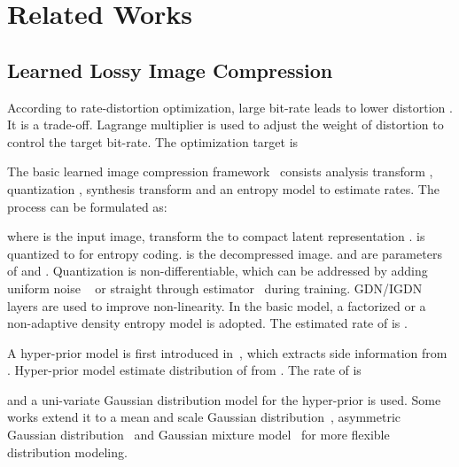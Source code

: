 \documentclass[sigconf]{acmart}
\begin{document}
\section{Related Works}\label{Sec:related}
\subsection{Learned Lossy Image Compression}
According to rate-distortion optimization, large bit-rate 
leads to lower distortion .
It is a trade-off. Lagrange multiplier  is used to adjust the weight of
distortion to control the target bit-rate. The optimization target is
\par
The basic learned image compression framework~\cite{balle2017end} consists
analysis transform , quantization , synthesis transform  and
an entropy model to estimate rates. The process can be formulated as:

where  is the input image,  transform the  to
compact latent representation . 
is quantized to  for entropy coding.
 is the decompressed image.
 and  are parameters of  and .
Quantization is non-differentiable, which can be addressed by
adding uniform noise ~\cite{balle2017end} or
straight through estimator~\cite{DBLP:conf/iclr/TheisSCH17} during training.
GDN/IGDN~\cite{balle2016gdn} layers are used to improve non-linearity.
In the basic model, a factorized or
a non-adaptive density entropy model is adopted.
The estimated rate of  is
.\par
A hyper-prior model is first introduced in~\cite{balle2018variational},
which extracts side information  from .
Hyper-prior model estimate distribution of  from
. The rate of  is

and a uni-variate Gaussian distribution model for the hyper-prior is used.
Some works extend it to a mean and scale Gaussian distribution~\cite{DBLP:conf/nips/MinnenBT18},
asymmetric Gaussian distribution~\cite{DBLP:conf/cvpr/CuiWGGFB21} and
Gaussian mixture model~\cite{DBLP:conf/cvpr/ChengSTK20, DBLP:journals/corr/abs-2002-03370}
for more flexible distribution modeling.
\end{document}
